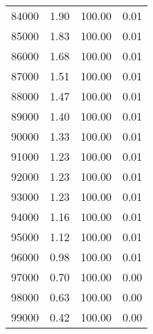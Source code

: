 \begin{table}[ht]
\begin{tabular}{rrrr}
  84000 & 1.90 & 100.00 & 0.01 \\ 
  85000 & 1.83 & 100.00 & 0.01 \\ 
  86000 & 1.68 & 100.00 & 0.01 \\ 
  87000 & 1.51 & 100.00 & 0.01 \\ 
  88000 & 1.47 & 100.00 & 0.01 \\ 
  89000 & 1.40 & 100.00 & 0.01 \\ 
  90000 & 1.33 & 100.00 & 0.01 \\ 
  91000 & 1.23 & 100.00 & 0.01 \\ 
  92000 & 1.23 & 100.00 & 0.01 \\ 
  93000 & 1.23 & 100.00 & 0.01 \\ 
  94000 & 1.16 & 100.00 & 0.01 \\ 
  95000 & 1.12 & 100.00 & 0.01 \\ 
  96000 & 0.98 & 100.00 & 0.01 \\ 
  97000 & 0.70 & 100.00 & 0.00 \\ 
  98000 & 0.63 & 100.00 & 0.00 \\ 
  99000 & 0.42 & 100.00 & 0.00 \\ 
   \hline
\end{tabular}
\end{table}
